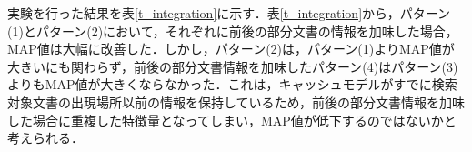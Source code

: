 実験を行った結果を表\ref{t_integration}に示す．表\ref{t_integration}から，パターン(1)とパターン(2)において，それぞれに前後の部分文書の情報を加味した場合，MAP値は大幅に改善した．しかし，パターン(2)は，パターン(1)よりMAP値が大きいにも関わらず，前後の部分文書情報を加味したパターン(4)はパターン(3)よりもMAP値が大きくならなかった．これは，キャッシュモデルがすでに検索対象文書の出現場所以前の情報を保持しているため，前後の部分文書情報を加味した場合に重複した特徴量となってしまい，MAP値が低下するのではないかと考えられる．

